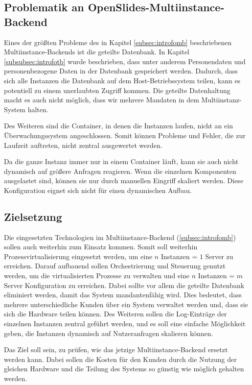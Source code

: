 \documentclass[11pt,a4paper]{article}
\begin{document}
\subsection{Problematik an OpenSlides-Multiinstance-Backend} 
\label{subsec:intropomb}
Eines der größten Probleme des in Kapitel \ref{subsec:introfomb} beschriebenen 
Multiinstance-Backends ist die geteilte Datenbank. In Kapitel 
\ref{subsubsec:introfotb} wurde beschrieben, dass unter anderem Personendaten 
und personenbezogene Daten in der Datenbank gespeichert werden. Dadurch, dass 
sich alle Instanzen die Datenbank auf dem Host-Betriebssystem teilen, kann es 
potentiell zu einem unerlaubten Zugriff kommen. Die geteilte Datenhaltung macht 
es auch nicht möglich, dass wir mehrere Mandaten in dem Multiinstanz-System 
halten.

Des Weiteren sind die Container, in denen die Instanzen laufen, nicht an ein 
Überwachungssystem angeschlossen. Somit können Probleme und Fehler, die zur 
Laufzeit auftreten, nicht zentral ausgewertet werden.

Da die ganze Instanz immer nur in einem Container läuft, kann sie auch nicht 
dynamisch auf größere Anfragen reagieren. Wenn die einzelnen Komponenten 
ausgelastet sind, können sie nur durch manuellen Eingriff skaliert werden. 
Diese Konfiguration eignet sich nicht für einen dynamischen Aufbau.
\subsection{Zielsetzung}
\label{subsec:introloe}
Die eingesetzten Technologien im Multiinstance-Backend (\ref{subsec:introfomb}) 
sollen auch weiterhin zum Einsatz kommen. Somit soll weiterhin 
Prozessvirtualisierung eingesetzt werden, um eine \glqq{}$n$ Instanzen = $1$ 
Server\grqq{} zu erreichen. Darauf aufbauend sollen Orchestrierung und 
Steuerung genutzt werden, um die virtualisierten Prozesse zu verwalten und eine 
\glqq{}$n$ Instanzen = $m$ Server\grqq{} Konfiguration zu erreichen. Dabei 
sollte vor allem die geteilte Datenbank eliminiert werden, damit das System 
mandantenfähig wird. Dies bedeutet, dass mehrere unterschiedliche Kunden über 
ein System verwaltet werden und, dass sie sich die Hardware teilen können. Des 
Weiteren sollen die Log-Einträge der einzelnen Instanzen zentral geführt werden,
und es soll eine einfache Möglichkeit geben, die Instanzen dynamisch auf 
Nutzeranfragen skalieren können.

Das Ziel soll sein, zu prüfen, wie das jetzige Multiinstance-Backend ersetzt 
werden kann. Dabei sollen die Kosten für den Kunden durch die Nutzung der 
gleichen Hardware und die Teilung des Systems so günstig wie möglich gehalten 
werden.
\clearpage
\end{document}
